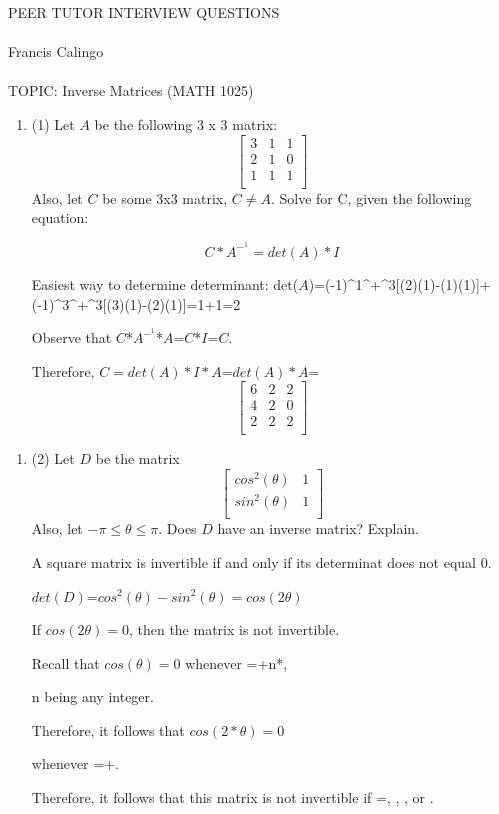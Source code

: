 \documentclass[12pt]{amsart}
\newcommand{\red}[1]{{\color{red} #1}}
\newcounter{probnum}
\newenvironment{prob}{\begin{enumerate}\setcounter{enumi}{\value{probnum}}}%
 {\setcounter{probnum}{\value{enumi}}\end{enumerate}}
\begin{document}
\begin{center}
{\large \sc 
PEER TUTOR INTERVIEW QUESTIONS} \\
\  \\ Francis Calingo\\
\\TOPIC: Inverse Matrices (MATH 1025) \\

 \end{center}
\vspace{.5in}

\begin{prob} 
\item[(1)]   Let $A$ be the following 3 x 3 matrix:
$$
\left[ 
\begin{array}{ccc}
3 & 1 & 1 \\
2 & 1 & 0 \\
1 & 1 & 1 \\
\end{array} \right]
$$
Also, let $C$ be some 3x3 matrix, \(C \neq A \). Solve for C, given the following equation:

$$
C*A^-^1=det(A)*I
$$

\red{Easiest way to determine determinant: det($A$)=(-1)^1^+^3[(2)(1)-(1)(1)]+(-1)^3^+^3[(3)(1)-(2)(1)]=1+1=2}

\red{Observe that $C$*$A^-^1$*$A$=$C$*$I$=$C$}.

\red{Therefore, $C=det(A)*I*A$=$det(A)*A$=}
\red{$$
\left[ 
\begin{array}{ccc}
6 & 2 & 2 \\
4 & 2 & 0 \\
2 & 2 & 2 \\
\end{array} \right]
$$}
 \end{prob}
 \bigskip
\begin{prob} 
\item[(2)]   Let $D$ be the matrix
 $$
\left[ 
\begin{array}{cc}
cos^2(\theta) & 1 \\
sin^2(\theta) & 1  \\
\end{array} \right]
$$
Also, let \(-\pi \leq \theta \leq \pi\).
Does $D$ have an inverse matrix? Explain. 

\red{A square matrix is invertible if and only if its determinat does not equal 0.}

\red{$det(D)$=$cos^2(\theta)-sin^2(\theta)=cos(2\theta)$}

\red{If $cos(2\theta)=0$, then the matrix is not invertible.}

\red{Recall that $cos(\theta)=0$ whenever \theta=+n*\pi}, 

\red{n being any integer.}

\red{Therefore, it follows that $cos(2*\theta)=0$}

\red{whenever \theta=+}.

\red{Therefore, it follows that this matrix is not invertible if \theta=\frac{-3\pi}{4}, \frac{-\pi}{4}, \frac{\pi}{4}, or \frac{3\pi}{4}}.
 \end{prob}
\end{document}
